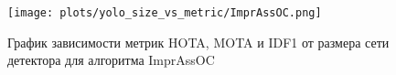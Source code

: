 \begin{figure}[ht]
    \centering
    \texttt{[image: plots/yolo\_size\_vs\_metric/ImprAssOC.png]}
    \caption{График зависимости метрик HOTA, MOTA и IDF1 от размера сети детектора для алгоритма ImprAssOC}
    \label{fig:yolo_ImprAssOC}
\end{figure}
\FloatBarrier



\FloatBarrier